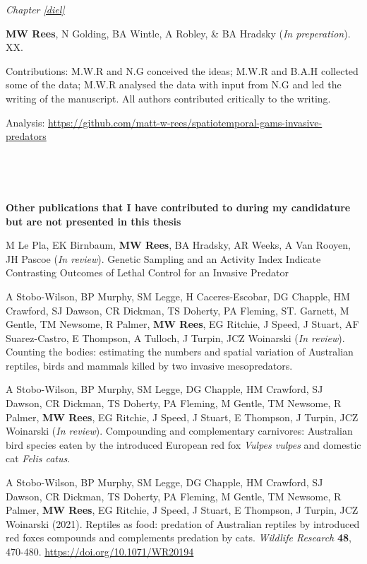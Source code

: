 \documentclass[11pt,a4paper,titlepage,twoside,openright]{style/unimelbthesis}
\begin{document}
\begin{frontmatter}
\begin{preface}
    \emph{Chapter \ref{diel}}
    
    \textbf{MW Rees}, N Golding, BA Wintle, A Robley, \& BA Hradsky (\emph{In preperation}). XX.
    
    Contributions: M.W.R and N.G conceived the ideas; M.W.R and B.A.H collected some of the data; M.W.R analysed the data with input from N.G and led the writing of the manuscript. All authors contributed critically to the writing.
    
    Analysis: \url{https://github.com/matt-w-rees/spatiotemporal-gams-invasive-predators}
    
    \(~\)
    
    \(~\)
    
    \textbf{Other publications that I have contributed to during my candidature but are not presented in this thesis}
    
    M Le Pla, EK Birnbaum, \textbf{MW Rees}, BA Hradsky, AR Weeks, A Van Rooyen, JH Pascoe (\emph{In review}).
    Genetic Sampling and an Activity Index Indicate Contrasting Outcomes of Lethal Control for an Invasive Predator
    
    A Stobo-Wilson, BP Murphy, SM Legge, H Caceres-Escobar, DG Chapple, HM Crawford, SJ Dawson, CR Dickman, TS Doherty, PA Fleming, ST. Garnett, M Gentle, TM Newsome, R Palmer, \textbf{MW Rees}, EG Ritchie, J Speed, J Stuart, AF Suarez-Castro, E Thompson, A Tulloch, J Turpin, JCZ Woinarski (\emph{In review}). Counting the bodies: estimating the numbers and spatial variation of Australian reptiles, birds and mammals killed by two invasive mesopredators.
    
    A Stobo-Wilson, BP Murphy, SM Legge, DG Chapple, HM Crawford, SJ Dawson, CR Dickman, TS Doherty, PA Fleming, M Gentle, TM Newsome, R Palmer, \textbf{MW Rees}, EG Ritchie, J Speed, J Stuart, E Thompson, J Turpin, JCZ Woinarski (\emph{In review}). Compounding and complementary carnivores: Australian bird species eaten by the introduced European red fox \emph{Vulpes vulpes} and domestic cat \emph{Felis catus}.
    
    A Stobo-Wilson, BP Murphy, SM Legge, DG Chapple, HM Crawford, SJ Dawson, CR Dickman, TS Doherty, PA Fleming, M Gentle, TM Newsome, R Palmer, \textbf{MW Rees}, EG Ritchie, J Speed, J Stuart, E Thompson, J Turpin, JCZ Woinarski (2021). Reptiles as food: predation of Australian reptiles by introduced red foxes compounds and complements predation by cats. \emph{Wildlife Research} \textbf{48}, 470-480. \url{https://doi.org/10.1071/WR20194}
    

\end{preface}
\end{frontmatter}
\end{document}
